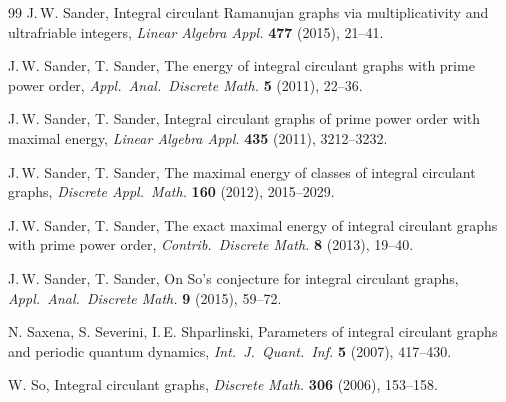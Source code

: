 \documentclass[12pt,a4paper]{article}
\theoremstyle{plain}
\theoremstyle{definition}
\begin{document}
\begin{thebibliography}{99}
J.\,W. Sander,
Integral circulant Ramanujan graphs via multiplicativity and ultrafriable
integers,
\emph{Linear Algebra Appl.} \textbf{477} (2015), 21--41.

J.\,W. Sander, T. Sander,
The energy of integral circulant graphs with prime power order,
\emph{Appl.\ Anal.\ Discrete Math.} \textbf{5} (2011), 22--36.

J.\,W. Sander, T. Sander,
Integral circulant graphs of prime power order with maximal energy,
\emph{Linear Algebra Appl.} \textbf{435} (2011), 3212--3232.

J.\,W. Sander, T. Sander,
The maximal energy of classes of integral circulant graphs,
\emph{Discrete Appl.\ Math.} \textbf{160} (2012), 2015--2029.

J.\,W. Sander, T. Sander,
The exact maximal energy of integral circulant graphs with prime power order,
\emph{Contrib.\ Discrete Math.} \textbf{8} (2013), 19--40.

J.\,W. Sander, T. Sander,
On So's conjecture for integral circulant graphs,
\emph{Appl.\ Anal.\ Discrete Math.} \textbf{9} (2015), 59--72.

N. Saxena, S. Severini, I.\,E. Shparlinski,
Parameters of integral circulant graphs and periodic quantum dynamics,
\emph{Int.\ J.\ Quant.\ Inf.} \textbf{5} (2007), 417--430.

W. So,
Integral circulant graphs,
\emph{Discrete Math.} \textbf{306} (2006), 153--158.

\end{thebibliography}
\end{document}
